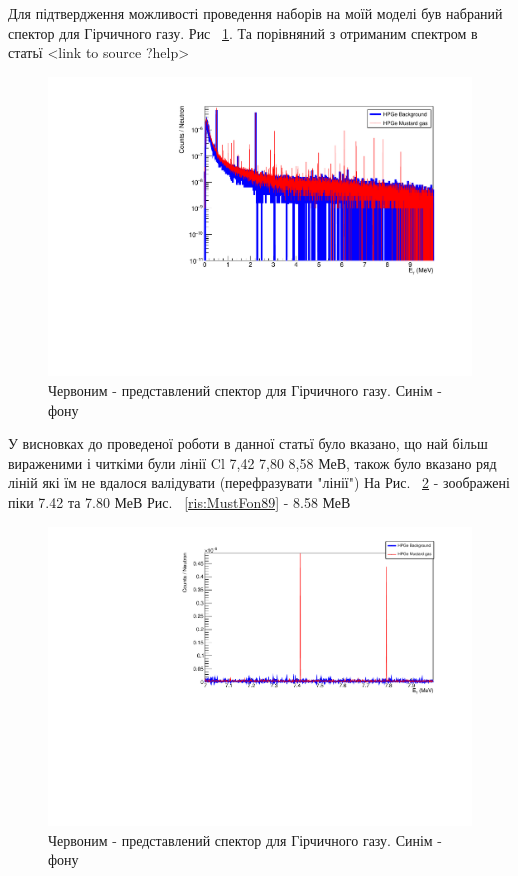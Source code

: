 \documentclass[a4paper, 14pt]{article}
\numberwithin{equation}{section}
\numberwithin{table}{section}
\begin{document}
	Для підтвердження можливості проведення наборів на моїй моделі був набраний спектор для Гірчичного газу. Рис ~\ref{ris:MustBackAllLogSm}. Та порівняний з отриманим спектром в статьї <link to source ?help> 	
	\begin{figure}[hbt!]
		\centering \includegraphics[width=1\textwidth]{res/smMustFonAll.pdf}
		\caption{Червоним - представлений спектор для Гірчичного газу. Синім - фону} 
		\label{ris:MustBackAllLogSm}	
	\end{figure} 
	У висновках до проведеної роботи в данної статьї було вказано, що най більш вираженими і читкіми були лінії Cl 7,42 7,80 8,58 МеВ, також було вказано ряд ліній які їм не вдалося валідувати (перефразувати "лінії") 
	На Рис. ~\ref{ris:MustFon78} - зоображені піки 7.42 та 7.80 МеВ
	Рис.  ~\ref{ris:MustFon89} - 8.58 МеВ	
	\begin{figure}[hbt!]
		\centering \includegraphics[width=1\textwidth]{res/mustFon78.pdf}
		\caption{Червоним - представлений спектор для Гірчичного газу. Синім - фону} 
		\label{ris:MustFon78}	
	\end{figure} 	
\end{document}
